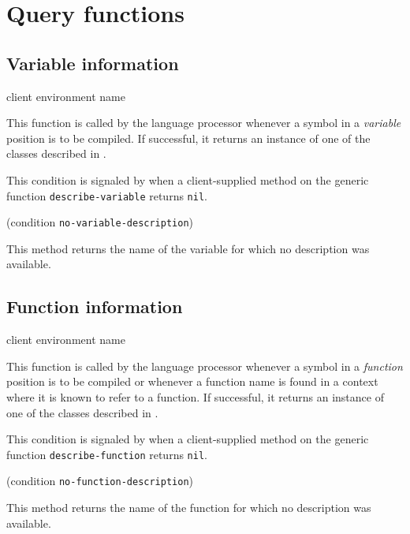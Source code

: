 \section{Query functions}

\subsection{Variable information}

{\footnotesize
{} {client environment name}
}

This function is called by the language processor whenever a symbol in
a \emph{variable} position is to be compiled.  If successful, it
returns an instance of one of the classes described in
.

{\footnotesize
{}
}

This condition is signaled by \sysname{} when a client-supplied method
on the generic function \texttt{describe-variable} returns \texttt{nil}.

{\footnotesize
{} {(condition {\tt no-variable-description})}
}

This method returns the name of the variable for which no description was
available.

\subsection{Function information}

{\footnotesize
{} {client environment name}
}

This function is called by the language processor whenever a symbol in
a \emph{function} position is to be compiled or whenever a function
name is found in a context where it is known to refer to a function.
If successful, it returns an instance of one of the classes described
in .

{\footnotesize
{}
}

This condition is signaled by \sysname{} when a client-supplied method
on the generic function \texttt{describe-function} returns \texttt{nil}.

{\footnotesize
{} {(condition {\tt no-function-description})}
}

This method returns the name of the function for which no description was
available.

